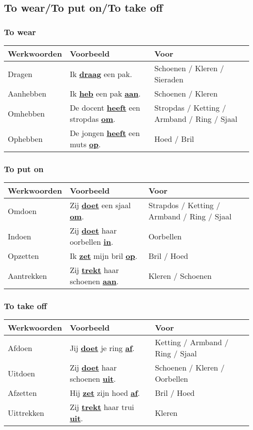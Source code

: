 \documentclass[a4paper,14pt]{extarticle}
\newcommand{\emp}[1]{\underline{\textbf{#1}}}
\begin{document}
\subsection{To wear/To put on/To take off}
\subsubsection{To wear}
\begin{tabularx}{\textwidth}{ p{} p{} p{} }
 \hline
 Werkwoorden & Voorbeeld & Voor \\
 \hline
 Dragen & Ik \emp{draag} een pak. & Schoenen / Kleren / Sieraden \\
 Aanhebben & Ik \emp{heb} een pak \emp{aan}. & Schoenen / Kleren \\
 Omhebben & De docent \emp{heeft} een stropdas \emp{om}. & Stropdas / Ketting / Armband / Ring / Sjaal \\
 Ophebben & De jongen \emp{heeft} een muts \emp{op}. & Hoed / Bril \\
\end{tabularx}
\subsubsection{To put on}
\begin{tabularx}{\textwidth}{ p{} p{} p{} }
 \hline
 Werkwoorden & Voorbeeld & Voor \\
 \hline
 Omdoen & Zij \emp{doet} een sjaal \emp{om}. & Strapdos / Ketting / Armband / Ring / Sjaal \\
 Indoen & Zij \emp{doet} haar oorbellen \emp{in}. & Oorbellen \\
 Opzetten & Ik \emp{zet} mijn bril \emp{op}. & Bril / Hoed \\
 Aantrekken & Zij \emp{trekt} haar schoenen \emp{aan}. & Kleren / Schoenen \\
\end{tabularx}
\subsubsection{To take off}
\begin{tabularx}{\textwidth}{ p{} p{} p{} }
 \hline
 Werkwoorden & Voorbeeld & Voor \\
 \hline
 Afdoen & Jij \emp{doet} je ring \emp{af}. & Ketting / Armband / Ring / Sjaal \\
 Uitdoen & Zij \emp{doet} haar schoenen \emp{uit}. & Schoenen / Kleren / Oorbellen \\
 Afzetten & Hij \emp{zet} zijn hoed \emp{af}. & Bril / Hoed \\
 Uittrekken & Zij \emp{trekt} haar trui \emp{uit}. & Kleren \\
\end{tabularx}
\end{document}
